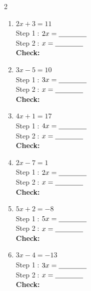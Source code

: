 \documentclass[12pt]{article}
\newcommand{\wsp}{\vspace{2.4cm}}
\newcommand{\sblank}{\underline{\hspace{1.4cm}}}
\begin{document}
\begin{multicols}{2}
\begin{enumerate}[label=\textbf{\arabic*.}, itemsep=0pt]

  \item $2x + 3 = 11$\\[3pt]
  Step \textcircled{1}: $2x = \sblank$\\[3pt]
  Step \textcircled{2}: $x = \sblank$\\[3pt]
  \textbf{Check:} \underline{\hspace{3.2cm}}
  \wsp

  \item $3x - 5 = 10$\\[3pt]
  Step \textcircled{1}: $3x = \sblank$\\[3pt]
  Step \textcircled{2}: $x = \sblank$\\[3pt]
  \textbf{Check:} \underline{\hspace{3.2cm}}
  \wsp

  \item $4x + 1 = 17$\\[3pt]
  Step \textcircled{1}: $4x = \sblank$\\[3pt]
  Step \textcircled{2}: $x = \sblank$\\[3pt]
  \textbf{Check:} \underline{\hspace{3.2cm}}
  \wsp

  \item $2x - 7 = 1$\\[3pt]
  Step \textcircled{1}: $2x = \sblank$\\[3pt]
  Step \textcircled{2}: $x = \sblank$\\[3pt]
  \textbf{Check:} \underline{\hspace{3.2cm}}
  \wsp

  \item $5x + 2 = -8$\\[3pt]
  Step \textcircled{1}: $5x = \sblank$\\[3pt]
  Step \textcircled{2}: $x = \sblank$\\[3pt]
  \textbf{Check:} \underline{\hspace{3.2cm}}
  \wsp

  \item $3x - 4 = -13$\\[3pt]
  Step \textcircled{1}: $3x = \sblank$\\[3pt]
  Step \textcircled{2}: $x = \sblank$\\[3pt]
  \textbf{Check:} \underline{\hspace{3.2cm}}
  \wsp


\end{enumerate}
\end{multicols}
\end{document}
